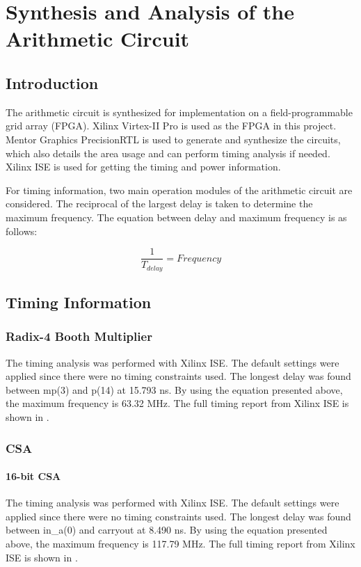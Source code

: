 \section{Synthesis and Analysis of the Arithmetic Circuit}

\subsection{Introduction}

The arithmetic circuit is synthesized for implementation on a field-programmable grid array (FPGA).
Xilinx Virtex-II Pro is used as the FPGA in this project.
Mentor Graphics PrecisionRTL is used to generate and synthesize the circuits,
which also details the area usage and can perform timing analysis if needed.
Xilinx ISE is used for getting the timing and power information.

For timing information, two main operation modules of the arithmetic circuit are considered.
The reciprocal of the largest delay is taken to determine the maximum frequency.
The equation between delay and maximum frequency is as follows:

\begin{equation}
	\frac{1}{T_{delay}} = Frequency
	\label{exp:dl}
\end{equation}


\subsection{Timing Information}
\subsubsection{Radix-4 Booth Multiplier}
The timing analysis was performed with Xilinx ISE.
The default settings were applied since there were no timing constraints used.
The longest delay was found between mp(3) and p(14) at 15.793 ns.
By using the equation presented above, the maximum frequency is 63.32 MHz.
The full timing report from Xilinx ISE is shown in .

\subsubsection{CSA}
\paragraph{16-bit CSA}
The timing analysis was performed with Xilinx ISE.
The default settings were applied since there were no timing constraints used.
The longest delay was found between in\_a(0) and carryout at 8.490 ns.
By using the equation presented above, the maximum frequency is 117.79 MHz.
The full timing report from Xilinx ISE is shown in .

